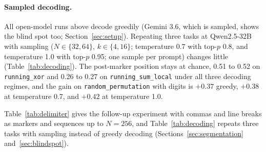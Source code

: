 \documentclass[10pt]{article} %
\newcommand{\task}[1]{\texttt{#1}}
\begin{document}
\paragraph{Sampled decoding.} All open-model runs above decode greedily (Gemini 3.6, which is sampled, shows the blind spot too; Section~\ref{sec:setup}). Repeating three tasks at Qwen2.5-32B with sampling ($N \in \{32, 64\}$, $k \in \{4, 16\}$; temperature 0.7 with top-$p$ 0.8, and temperature 1.0 with top-$p$ 0.95; one sample per prompt) changes little (Table~\ref{tab:decoding}). The post-marker position stays at chance, 0.51 to 0.52 on \task{running\_xor} and 0.26 to 0.27 on \task{running\_sum\_local} under all three decoding regimes, and the gain on \task{random\_permutation} with digits is $+0.37$ greedy, $+0.38$ at temperature 0.7, and $+0.42$ at temperature 1.0.

Table~\ref{tab:delimiter} gives the follow-up experiment with commas and line breaks as markers and sequences up to $N = 256$, and Table~\ref{tab:decoding} repeats three tasks with sampling instead of greedy decoding (Sections~\ref{sec:segmentation} and~\ref{sec:blindspot}).

\begin{table}[!htbp]
\centering
\small
\caption{Delimiter type and longer sequences at Qwen2.5-32B ($k \in \{4, 16\}$ pooled, 20 trials per cell; \task{random\_permutation} with digits at $A = 8$, \task{running\_xor}, and \task{running\_sum\_local} at modulus 4). Change in accuracy: marker run minus no-marker run, pooled over positions. Post-marker and within-segment: marker run minus the no-marker run at the same positions. Each delimiter is named in its own constraint sentence. The \texttt{|} cells at $N = 64$ reproduce the main grid exactly (same prompts, greedy decoding). No output reached the generation budget.}
\label{tab:delimiter}
\resizebox{\linewidth}{!}{}
\end{table}

\begin{table}[!htbp]
\centering
\small
\caption{Decoding and prompt delivery at Qwen2.5-32B ($N \in \{32, 64\}$, $k \in \{4, 16\}$ pooled, 20 prompts per cell; \task{random\_permutation} at $A = 8$, \task{running\_sum\_local} at modulus 4). Main grid: greedy decoding with the chat template's own default system prompt, on the same prompts. Sampling: one sample per prompt. Empty system message: \texttt{""}, which suppresses the default; task-oriented: ``You are a precise, deterministic text transformer\ldots''; no chat template: the raw prompt as a completion. Change: marker run minus no-marker run, with a 95\% interval; post-marker and within-segment: against the no-marker run of the same condition at the same positions.}
\label{tab:decoding}
\resizebox{\linewidth}{!}{}
\end{table}
\end{document}

